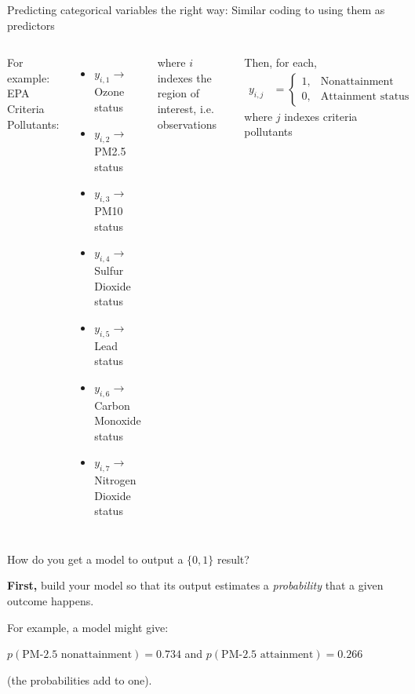 \documentclass[aspectratio=169]{beamer}
\begin{document}
\begin{frame}{Predicting categorical variables the right way: Similar coding to using them as predictors}

\begin{columns}
For example:  EPA Criteria Pollutants:
\begin{itemize}
\item $y_{i,1} \rightarrow$ Ozone status
\item $y_{i,2} \rightarrow$ PM2.5 status
\item $y_{i,3} \rightarrow$ PM10 status
\item $y_{i,4} \rightarrow$ Sulfur Dioxide status
\item $y_{i,5} \rightarrow$ Lead status
\item $y_{i,6} \rightarrow$ Carbon Monoxide status
\item $y_{i,7} \rightarrow$ Nitrogen Dioxide status
\end{itemize}
where $i$ indexes the region of interest, i.e. observations

Then, for each, 
\begin{align*}
y_{i,j} &=\begin{cases}
    1, & \text{Nonattainment status}\\
    0, & \text{Attainment status}
  \end{cases}
\end{align*}
where $j$ indexes criteria pollutants
\end{columns}

\end{frame}

\begin{frame}{How do you get a model to output a $\{0,1\}$ result?}

\pause
\vspace{5mm}

\textbf{First,} build your model so that its output estimates a \textit{probability} that a given outcome happens.

\vspace{5mm}

For example, a model might give:

\vspace{5mm}
$p(\text{PM-2.5 nonattainment}) = 0.734$ and 
$p(\text{PM-2.5 attainment}) = 0.266$ 

\vspace{5mm}
(the probabilities add to one).

\end{frame}
\end{document}
